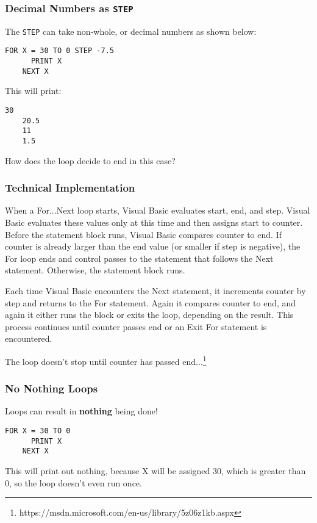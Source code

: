 \documentclass[handout,fleqn, t]{beamer}
\begin{document}
\begin{frame}[fragile]
  \frametitle{Decimal Numbers as \lstinline{STEP}}

  The \lstinline{STEP} can take non-whole, or decimal numbers as shown below:

  \begin{lstlisting}[gobble=4]
    FOR X = 30 TO 0 STEP -7.5
      PRINT X
    NEXT X
  \end{lstlisting}

  This will print:
  \begin{lstlisting}[gobble=4]
    30
    20.5
    11
    1.5
  \end{lstlisting}

  How does the loop decide to end in this case?
\end{frame}


\begin{frame}
  \frametitle{Technical Implementation}

  When a For...Next loop starts, Visual Basic evaluates start, end, and step.
  Visual Basic evaluates these values only at this time and then assigns start
  to counter. Before the statement block runs, Visual Basic compares counter to
  end. If counter is already larger than the end value (or smaller if step is
  negative), the For loop ends and control passes to the statement that follows
  the Next statement. Otherwise, the statement block runs.

  Each time Visual Basic encounters the Next statement, it increments counter
  by step and returns to the For statement. Again it compares counter to end,
  and again it either runs the block or exits the loop, depending on the
  result. This process continues until counter passes end or an Exit For
  statement is encountered.

  The loop doesn't stop until counter has passed
  end...\footnote{https://msdn.microsoft.com/en-us/library/5z06z1kb.aspx}
\end{frame}

\begin{frame}[fragile]
  \frametitle{No Nothing Loops}

  Loops can result in \textbf{nothing} being done!

  \begin{lstlisting}[gobble=4]
    FOR X = 30 TO 0
      PRINT X
    NEXT X
  \end{lstlisting}

  This will print out nothing, because X will be assigned 30, which is greater
  than 0, so the loop doesn't even run once.
\end{frame}
\end{document}
